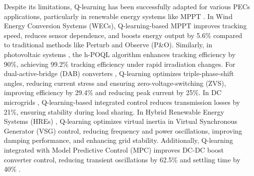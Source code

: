 Despite its limitations, Q-learning has been successfully adapted for various PECs applications, particularly in renewable energy systems like MPPT \cite{wei2015reinforcement}. In Wind Energy Conversion Systems (WECs), Q-learning-based MPPT improves tracking speed, reduces sensor dependence, and boosts energy output by 5.6\% compared to traditional methods like Perturb and Observe (P\&O). Similarly, in photovoltaic systems \cite{chou2019maximum}, the h-POQL algorithm enhances tracking efficiency by 90\%, achieving 99.2\% tracking efficiency under rapid irradiation changes. For dual-active-bridge (DAB) converters \cite{tang2020reinforcement}, Q-learning optimizes triple-phase-shift angles, reducing current stress and ensuring zero-voltage-switching (ZVS), improving efficiency by 29.4\% and reducing peak current by 25\%. In DC microgrids \cite{chaturvedi2023reinforcement}, Q-learning-based integrated control reduces transmission losses by 21\%, ensuring stability during load sharing. In Hybrid Renewable Energy Systems (HREs) \cite{zhang2020virtual}, Q-learning optimizes virtual inertia in Virtual Synchronous Generator (VSG) control, reducing frequency and power oscillations, improving damping performance, and enhancing grid stability. Additionally, Q-learning integrated with Model Predictive Control (MPC) improves DC-DC boost converter control, reducing transient oscillations by 62.5\% and settling time by 40\% \cite{marahatta2022model}.


